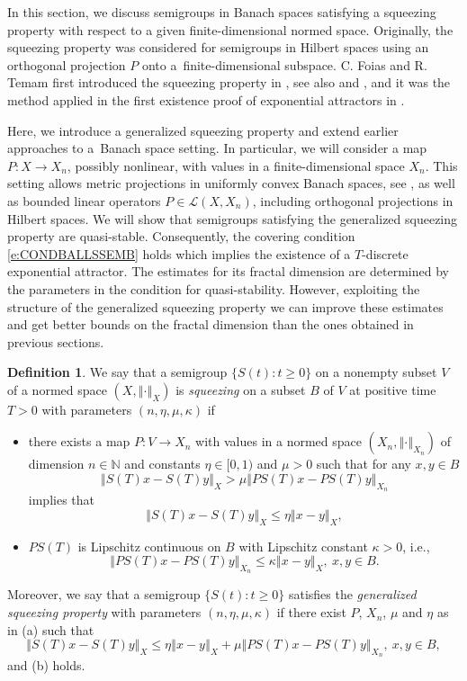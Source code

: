 \documentclass[a4paper,12pt,reqno]{amsart}
\theoremstyle{plain}
\theoremstyle{definition}
\newtheorem{defn}[lem]{Definition}
\numberwithin{equation}{section}
\newcommand{\N}{\mathbb{N}}
\newcommand{\norm}[1]{\left\Vert#1\right\Vert}
\renewcommand{\geq}{\geqslant}
\renewcommand{\leq}{\leqslant}
\begin{document}
In this section, we discuss semigroups in Banach spaces satisfying a squeezing property with respect to a given finite-dimensional normed space. Originally, the squeezing property was considered for semigroups in Hilbert spaces using an orthogonal projection $P$ onto a~finite-dimensional subspace. C. Foias and R. Temam first introduced the squeezing property in \cite{FoTe0}, see also \cite{EFNT94} and \cite[p.~101]{chueshov}, and it was the method applied in the first existence proof of exponential attractors in \cite{EFNT94}. 

Here, we introduce a generalized squeezing property and extend earlier approaches to a~Banach space setting. 
In particular, we will consider a map $P\colon X\to X_n$, possibly nonlinear, with values in a finite-dimensional space $X_n$. This setting allows metric projections in uniformly convex Banach spaces, see \cite[p.~392]{Brezis11}, as well as bounded linear operators $P\in\mathcal{L}(X,X_n)$, including orthogonal projections in Hilbert spaces.
We will show that semigroups satisfying the generalized squeezing property are quasi-stable. Consequently, the covering condition \eqref{e:CONDBALLSSEMB} holds which implies the existence of a $T$-discrete exponential attractor. The estimates for its fractal dimension are determined by the parameters in the condition for quasi-stability. However, exploiting the structure of the generalized squeezing property we can improve these estimates and get better bounds on the fractal dimension than the ones obtained in previous sections.  

\begin{defn}\label{defn:BANACHSQU}
We say that a semigroup $\{S(t)\colon t\geq 0\}$ on a nonempty subset $V$ of a normed space $(X,\norm{\cdot}_{X})$
is \emph{squeezing} on a subset $B$ of $V$ at positive time $T>0$ with parameters $(n,\eta,\mu,\kappa)$ if
\begin{itemize}
\item[(a)] there exists a map $P\colon V\to X_n$ with values in a normed space $(X_n,\norm{\cdot}_{X_n})$ of dimension $n\in\N$ and constants  $\eta\in[0,1)$ and $\mu>0$ such that for any $x,y\in B$
$$\norm{S(T)x-S(T)y}_{X}>\mu\norm{PS(T)x-PS(T)y}_{X_n}$$
implies that
$$\norm{S(T)x-S(T)y}_{X}\leq\eta\norm{x-y}_{X},$$
\item[(b)] $PS(T)$ is Lipschitz continuous on $B$ with Lipschitz constant $\kappa>0$, i.e.,
\begin{equation*}
\norm{PS(T)x-PS(T)y}_{X_n}\leq \kappa\norm{x-y}_{X},\ x,y\in B.
\end{equation*}
\end{itemize}
Moreover, we say that a semigroup $\{S(t)\colon t\geq 0\}$ satisfies the \emph{generalized squeezing property} with parameters $(n,\eta,\mu,\kappa)$ if there exist $P$, $X_n$, $\mu$ and $\eta$ as in (a) such that 
\begin{equation}\label{e:BANACHSQU2}
\norm{S(T)x-S(T)y}_{X}\leq\eta\norm{x-y}_{X}+\mu\norm{PS(T)x-PS(T)y}_{X_n},\ x,y\in B,
\end{equation}
and (b) holds.
\end{defn}
\end{document}
